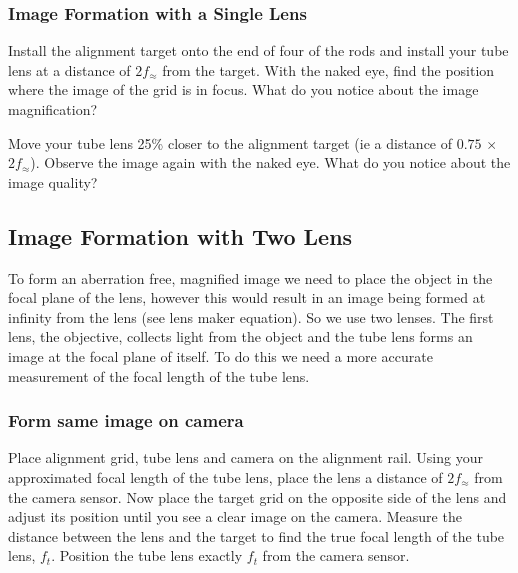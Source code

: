 \documentclass[12pt,a4paper,twoside]{article}
\begin{document}
\subsubsection{Image Formation with a Single Lens}

Install the alignment target onto the end of four of the rods and install your tube lens at a distance of $2f_{\approx}$ from the target. With the naked eye, find the position where the image of the grid is in focus. What do you notice about the image magnification?
        \vspace{2cm}

Move your tube lens 25\% closer to the alignment target (ie a distance of $0.75$ $\times$ $2f_{\approx}$). Observe the image again with the naked eye. What do you notice about the image quality?
        \vspace{2cm}

\subsection{Image Formation with Two Lens}

To form an aberration free, magnified image we need to place the object in the focal plane of the lens, however this would result in an image being formed at infinity from the lens (see lens maker equation). So we use two lenses. The first lens, the objective, collects light from the object and the tube lens forms an image at the focal plane of itself. To do this we need a more accurate measurement of the focal length of the tube lens.

\subsubsection{Form same image on camera}

Place alignment grid, tube lens and camera on the alignment rail. Using your approximated focal length of the tube lens, place the lens a distance of $2f_{\approx}$ from the camera sensor. Now place the target grid on the opposite side of the lens and adjust its position until you see a clear image on the camera. Measure the distance between the lens and the target to find the true focal length of the tube lens, $f_t$. Position the tube lens exactly $f_t$ from the camera sensor.
\end{document}
